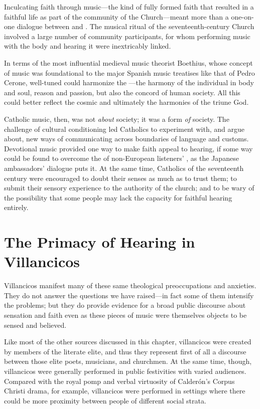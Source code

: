 Inculcating faith through music---the kind of fully formed faith that resulted in a faithful life as part of the community of the Church---meant more than a one-on-one dialogue between  and .
The musical ritual of the seventeenth-century Church involved a large number of community participants, for whom performing music with the body and hearing it were inextricably linked.

In terms of the most influential medieval music theorist Boethius, whose concept of music was foundational to the major Spanish music treatises like that of Pedro Cerone, well-tuned  could harmonize the ---the harmony of the individual in body and soul, reason and passion, but also the concord of human society.%
    \Autocite[\XXX]{Cerone:Melopeo}
All this could better reflect the cosmic  and ultimately the harmonies of the triune God.

Catholic music, then, was not \emph{about} society; it was a form \emph{of} society.
The challenge of cultural conditioning led Catholics to experiment with, and argue about, new ways of communicating across boundaries of language and customs.
Devotional music provided one way to make faith appeal to hearing, if some way could be found to overcome the  of non-European listeners' , as the Japanese ambassadors' dialogue puts it.
At the same time, Catholics of the seventeenth century were encouraged to doubt their senses as much as to trust them; to submit their sensory experience to the authority of the church; and to be wary of the possibility that some people may lack the capacity for faithful hearing entirely.

\section{The Primacy of Hearing in Villancicos}

Villancicos manifest many of these same theological preoccupations and anxieties.
They do not answer the questions we have raised---in fact some of them intensify the problems; but they do provide evidence for a broad public discourse about sensation and faith even as these pieces of music were themselves objects to be sensed and believed.

Like most of the other sources discussed in this chapter, villancicos were created by members of the literate elite, and thus they represent first of all a discourse between those elite poets, musicians, and churchmen.
At the same time, though, villancicos were generally performed in public festivities with varied audiences.
Compared with the royal pomp and verbal virtuosity of Calderón's Corpus Christi drama, for example, villancicos were performed in settings where there could be more proximity between people of different social strata.

